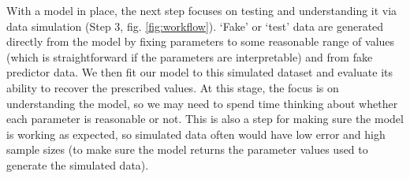 \documentclass[11pt]{article}
\begin{document}
With a model in place, the next step focuses on testing and understanding it via data simulation (Step 3, fig. \ref{fig:workflow}). `Fake' or `test' data are generated directly from the model by fixing parameters to some reasonable range of values (which is straightforward if the parameters are interpretable) and from fake predictor data. %
We then fit our model to this simulated dataset and evaluate its ability to recover the prescribed values. At this stage, the focus is on understanding the model, so we may need to spend time thinking about whether each parameter is reasonable or not. This is also a step for making sure the model is working as expected, so simulated data often would have low error and high sample sizes (to make sure the model returns the parameter values used to generate the simulated data). %
\end{document}
